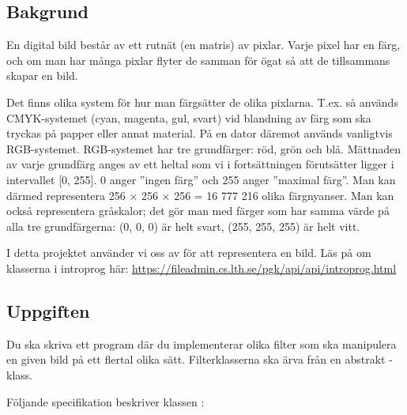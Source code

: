 

\subsection{Bakgrund}

En digital bild består av ett rutnät (en matris) av pixlar. Varje pixel har en färg, och om man har många pixlar flyter de samman för ögat så att de tillsammans skapar en bild.

Det finns olika system för hur man färgsätter de olika pixlarna. T.ex. så används CMYK-systemet (cyan, magenta, gul, svart) vid blandning av färg som ska tryckas på papper eller annat material. På en dator däremot används vanligtvis RGB-systemet. RGB-systemet har tre grundfärger: röd, grön och blå. Mättnaden av varje grundfärg anges av ett heltal som vi i fortsättningen förutsätter ligger i intervallet [0, 255]. 0 anger ''ingen färg'' och 255 anger ''maximal färg''. Man kan därmed representera 256 × 256 × 256 = 16 777 216 olika färgnyanser. Man kan också representera gråskalor; det gör man med färger som har samma värde på alla tre grundfärgerna: (0, 0, 0) är helt svart, (255, 255, 255) är helt vitt.

I detta projektet använder vi oss av  för att representera en bild. Läs på om klasserna i introprog här: \url{https://fileadmin.cs.lth.se/pgk/api/api/introprog.html}

\subsection{Uppgiften}
Du ska skriva ett program där du implementerar olika filter som ska manipulera en given bild på ett flertal olika sätt. 
Filterklasserna ska ärva från en abstrakt -klass.

Följande specifikation beskriver klassen :

